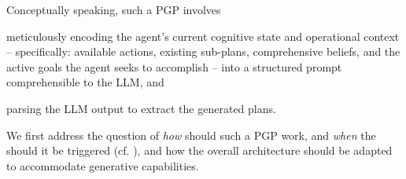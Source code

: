 Conceptually speaking,
such a \ac{PGP} involves
%
\begin{inlinelist}
    \item meticulously encoding the agent’s current cognitive state and operational context
    -- specifically: available actions, existing sub-plans, comprehensive beliefs,
    and the active goals the agent seeks to accomplish --
    into a structured prompt comprehensible to the \ac{LLM},
    and
    \item parsing the \ac{LLM} output to extract the generated plans.
\end{inlinelist}
%
We first address the question of \emph{how} should such a \ac{PGP} work,
and \emph{when} the should it be triggered (cf. ),
and how the overall \agentspeak{} architecture should be adapted to accommodate generative capabilities.

